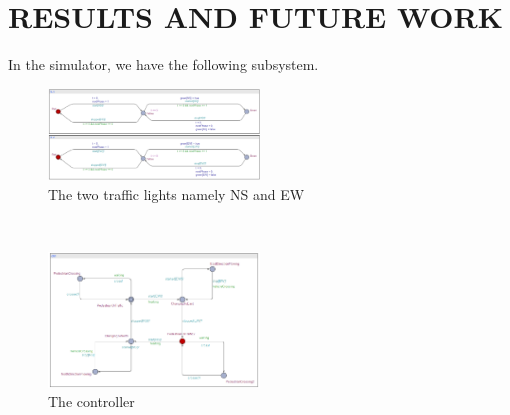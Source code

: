 \documentclass[conference]{IEEEtran}
\begin{document}
    

\section{RESULTS AND FUTURE WORK}

In the simulator, we have the following subsystem.

\begin{figure}[H]
    \centering
    \includegraphics[width=0.5\textwidth]{Fig 6.png}
    \caption{The two traffic lights namely NS and EW}
\end{figure}
\\

\begin{figure}[H]
    \centering
    \includegraphics[width=0.5\textwidth]{Fig 7.png}
    \caption{The controller}
\end{figure}
\\
\end{document}
